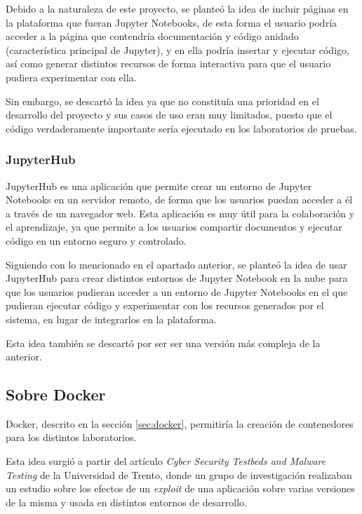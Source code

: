                 Debido a la naturaleza de este proyecto, se planteó la idea de incluir páginas en la plataforma que fueran Jupyter Notebooks, de esta forma el usuario podría acceder a la página que contendría documentación y código anidado (característica principal de Jupyter), y en ella podría insertar y ejecutar código, así como generar distintos recursos de forma interactiva para que el usuario pudiera experimentar con ella.

                Sin embargo, se descartó la idea ya que no constituía una prioridad en el desarrollo del proyecto y sus casos de uso eran muy limitados, puesto que el código verdaderamente importante sería ejecutado en los laboratorios de pruebas.
                
            \subsubsection{JupyterHub}

                JupyterHub \cite{jupyterhub} es una aplicación que permite crear un entorno de Jupyter Notebooks en un servidor remoto, de forma que los usuarios puedan acceder a él a través de un navegador web. Esta aplicación es muy útil para la colaboración y el aprendizaje, ya que permite a los usuarios compartir documentos y ejecutar código en un entorno seguro y controlado.
                
                Siguiendo con lo mencionado en el apartado anterior, se planteó la idea de usar JupyterHub para crear distintos entornos de Jupyter Notebook en la nube para que los usuarios pudieran acceder a un entorno de Jupyter Notebooks en el que pudieran ejecutar código y experimentar con los recursos generados por el sistema, en lugar de integrarlos en la plataforma.

                Esta idea también se descartó por ser ser una versión más compleja de la anterior.
                
                \newpage

        \subsection{Sobre Docker}

            Docker, descrito en la sección \ref{sec:docker}, permitiría la creación de contenedores para los distintos laboratorios.
                
            Esta idea surgió a partir del artículo \textit{Cyber Security Testbeds and Malware Testing} \cite{securitylab-malware-analysis} de la Universidad de Trento, donde un grupo de investigación realizaban un estudio sobre los efectos de un \textit{exploit} de una aplicación sobre varias versiones de la misma y usada en distintos entornos de desarrollo.

